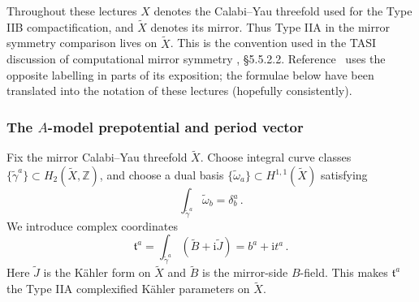 \begin{remark}\label{rem:L2-CMS-notation}
Throughout these lectures $X$ denotes the Calabi--Yau threefold used
for the Type IIB compactification, and $\widetilde X$ denotes its
mirror.  Thus Type IIA in the mirror symmetry comparison lives on
$\widetilde X$.  This is the convention used in the TASI discussion
of computational mirror symmetry \cite{McAllister:2025qwq},
\S5.5.2.2.  Reference~\cite{Demirtas:2023als} uses the opposite
labelling in parts of its exposition; the formulae below have been
translated into the notation of these lectures (hopefully consistently).
\end{remark}

\subsubsection*{The $A$-model prepotential and period vector}

Fix the mirror Calabi--Yau threefold $\widetilde X$.  Choose integral
curve classes $\{\widetilde\gamma^{a}\}\subset
H_2(\widetilde X,\mathbb Z)$, and choose a dual basis
$\{\widetilde\omega_a\}\subset H^{1,1}(\widetilde X)$ satisfying
\begin{equation}
    \int_{\widetilde\gamma^{a}}\widetilde\omega_b=\delta^{a}_{b}\, .
\end{equation}
We introduce complex coordinates
\begin{equation}\label{eq:L2-A-model-coord}
    \mathfrak t^a
    =
    \int_{\widetilde\gamma^{a}}(\widetilde B+
    \mathrm{i}\widetilde J)
    =
    b^a+\mathrm{i}t^a\, .
\end{equation}
Here $\widetilde J$ is the K\"ahler form on $\widetilde X$ and
$\widetilde B$ is the mirror-side $B$-field.  This makes
$\mathfrak t^a$ the Type IIA complexified Kähler parameters on $\widetilde X$.

